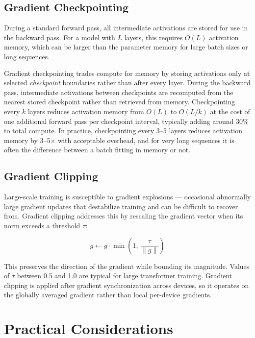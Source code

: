 \documentclass{book}
\begin{document}
\subsection{Gradient Checkpointing}
\label{sec:gradient_checkpointing}

During a standard forward pass, all intermediate activations are stored for
use in the backward pass. For a model with $L$ layers, this requires $O(L)$
activation memory, which can be larger than the parameter memory for large
batch sizes or long sequences.

Gradient checkpointing trades compute for memory by storing activations only
at selected \emph{checkpoint} boundaries rather than after every layer.
During the backward pass, intermediate activations between checkpoints are
recomputed from the nearest stored checkpoint rather than retrieved from
memory. Checkpointing every $k$ layers reduces activation memory from $O(L)$
to $O(L/k)$ at the cost of one additional forward pass per checkpoint
interval, typically adding around 30\% to total compute. In practice,
checkpointing every 3--5 layers reduces activation memory by 3--5$\times$
with acceptable overhead, and for very long sequences it is often the
difference between a batch fitting in memory or not.

\subsection{Gradient Clipping}
\label{sec:gradient_clipping}

Large-scale training is susceptible to gradient explosions --- occasional
abnormally large gradient updates that destabilize training and can be
difficult to recover from. Gradient clipping addresses this by rescaling
the gradient vector when its norm exceeds a threshold $\tau$:

\begin{equation}
\label{eq:grad_clip}
g \leftarrow g \cdot \min\!\left(1,\, \frac{\tau}{\|g\|}\right)
\end{equation}

This preserves the direction of the gradient while bounding its magnitude.
Values of $\tau$ between 0.5 and 1.0 are typical for large transformer
training. Gradient clipping is applied after gradient synchronization across
devices, so it operates on the globally averaged gradient rather than local
per-device gradients.

\section{Practical Considerations}
\label{sec:practical}
\end{document}
